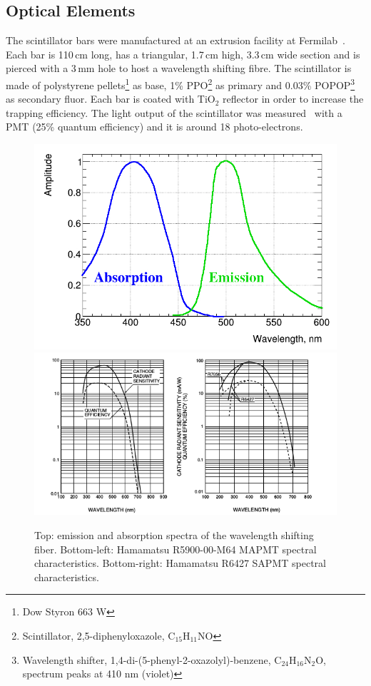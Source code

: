 \documentclass[a4paper,11pt]{article}
\begin{document}
\subsection{Optical Elements}
The scintillator bars were manufactured at an extrusion facility at Fermilab~\cite{PlaDalmau:2001fr}. Each bar is 110\,cm long, has a triangular,
1.7\,cm high, 3.3\,cm wide section and is pierced with a 3\,mm hole to host a wavelength shifting fibre. The scintillator is made of polystyrene
pellets\footnote{Dow Styron 663 W} as base, 1\% PPO\footnote{Scintillator, 2,5-diphenyloxazole, C$_{15}$H$_{11}$NO} as primary and
0.03\% POPOP\footnote{Wavelength shifter, 1,4-di-(5-phenyl-2-oxazolyl)-benzene, C$_{24}$H$_{16}$N$_{2}$O, spectrum peaks at 410 nm (violet)} as
secondary fluor. Each bar is coated with TiO$_2$ reflector in order to increase the trapping efficiency. The light output of the scintillator was
measured~\cite{PlaDalmau:2005df} with a PMT (25\% quantum efficiency) and it is around 18 photo-electrons. 

\begin{figure}
 \centering
 \includegraphics[width=.62\textwidth]{./wls_fiber_emission_spectrum.jpg}
 \includegraphics[width=.8\textwidth]{./pmt_qe.png} 
 \caption{Top: emission and absorption spectra of the wavelength shifting fiber. Bottom-left: Hamamatsu R5900-00-M64 MAPMT spectral characteristics.
 Bottom-right: Hamamatsu R6427 SAPMT spectral characteristics.}
 \label{qe}
\end{figure}
\end{document}
